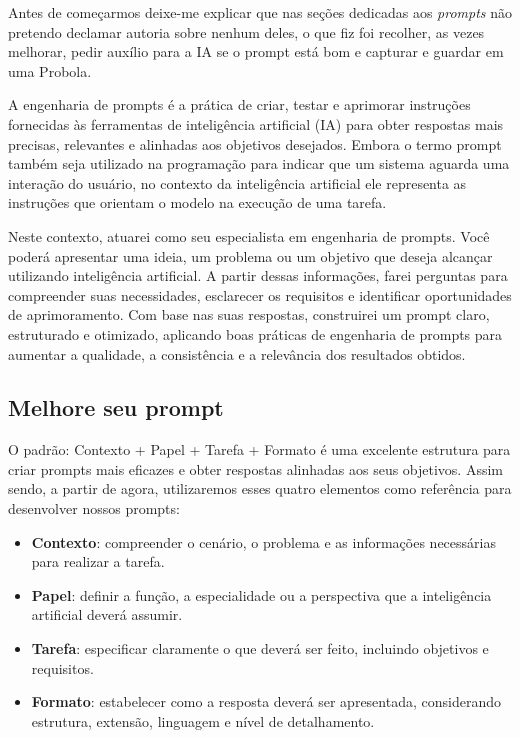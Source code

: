 \documentclass[11pt, a4paper]{article}
\begin{document}
Antes de começarmos deixe-me explicar que nas seções dedicadas aos \textit{prompts} não pretendo declamar autoria sobre nenhum deles, o que fiz foi recolher, as vezes melhorar, pedir auxílio para a IA se o prompt está bom e capturar e guardar em uma Probola.

A engenharia de prompts é a prática de criar, testar e aprimorar instruções fornecidas às ferramentas de inteligência artificial (IA) para obter respostas mais precisas, relevantes e alinhadas aos objetivos desejados. Embora o termo prompt também seja utilizado na programação para indicar que um sistema aguarda uma interação do usuário, no contexto da inteligência artificial ele representa as instruções que orientam o modelo na execução de uma tarefa.

Neste contexto, atuarei como seu especialista em engenharia de prompts. Você poderá apresentar uma ideia, um problema ou um objetivo que deseja alcançar utilizando inteligência artificial. A partir dessas informações, farei perguntas para compreender suas necessidades, esclarecer os requisitos e identificar oportunidades de aprimoramento. Com base nas suas respostas, construirei um prompt claro, estruturado e otimizado, aplicando boas práticas de engenharia de prompts para aumentar a qualidade, a consistência e a relevância dos resultados obtidos. 

\subsection*{Melhore seu prompt}
O padrão: Contexto + Papel + Tarefa + Formato é uma excelente estrutura para criar prompts mais eficazes e obter respostas alinhadas aos seus objetivos. Assim sendo, a partir de agora, utilizaremos esses quatro elementos como referência para desenvolver nossos prompts:
\begin{itemize}
	\item \textbf{Contexto}: compreender o cenário, o problema e as informações necessárias para realizar a tarefa.
	\item \textbf{Papel}: definir a função, a especialidade ou a perspectiva que a inteligência artificial deverá assumir.
	\item \textbf{Tarefa}: especificar claramente o que deverá ser feito, incluindo objetivos e requisitos.
	\item \textbf{Formato}: estabelecer como a resposta deverá ser apresentada, considerando estrutura, extensão, linguagem e nível de detalhamento.
\end{itemize}
\end{document}

